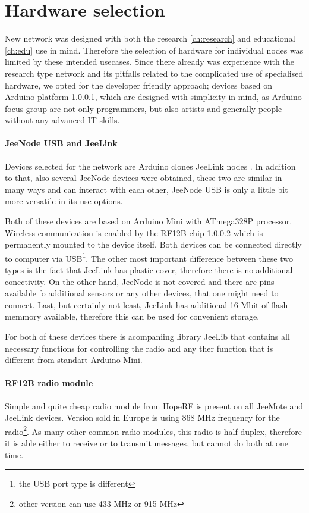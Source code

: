 \documentclass[
  digital, %
  table,   %
  nolof,     %
  nolot,     %
           oneside
]{fithesis3}
\begin{document}
  \section{Hardware selection}\label{sec:hw}
  New network was designed with both the research \ref{ch:research} and educational \ref{ch:edu} use in mind. Therefore the selection of hardware for individual nodes was limited by these intended usecases. Since there already was experience with the research type network \cite{Matyas2015}
  and its pitfalls related to the complicated use of specialised hardware, we opted for the developer friendly approach; devices based on Arduino platform \ref{par:jeeLink}, which are designed with simplicity in mind, as Arduino focus group are not only programmers, but also artists and generally people without any advanced IT skills.

  \paragraph{JeeNode USB and JeeLink}\label{par:jeeLink} %
  Devices selected for the network are Arduino clones JeeLink nodes \cite{JeeLink}. In addition to that, also several JeeNode devices \cite{JeeNode} were obtained, these two are similar in many ways and can interact with each other, JeeNode USB is only a little bit more versatile in its use options.

  Both of these devices are based on Arduino Mini \cite{ArduinoMini}
  with ATmega328P processor. Wireless communication is enabled by the RF12B chip \ref{par:radio} \cite{RF12B}
  which is permanently mounted to the device itself. Both devices can be connected directly to computer via USB\footnote{the USB port type is different}. The other most important difference between these two types is the fact that JeeLink has plastic cover, therefore there is no additional conectivity. On the other hand, JeeNode is not covered and there are pins available fo additional sensors or any other devices, that one might need to connect. Last, but certainly not least, JeeLink has additional 16 Mbit of flash memmory \cite{JeeLink}
  available, therefore this can be used for convenient storage.

  For both of these devices there is acompaniing library JeeLib \cite{JeeLib}
  that contains all necessary functions for controlling the radio and any ther function that is different from standart Arduino Mini.
  \paragraph{RF12B radio module}\label{par:radio} %
  Simple and quite cheap radio module from HopeRF \cite{RF12B}
  is present on all JeeMote and JeeLink devices. Version sold in Europe is using 868 MHz frequency for the radio\footnote{other version can use 433 MHz or 915 MHz}. As many other common radio modules, this radio is half-duplex, therefore it is able either to receive or to transmit messages, but cannot do both at one time.
\end{document}
